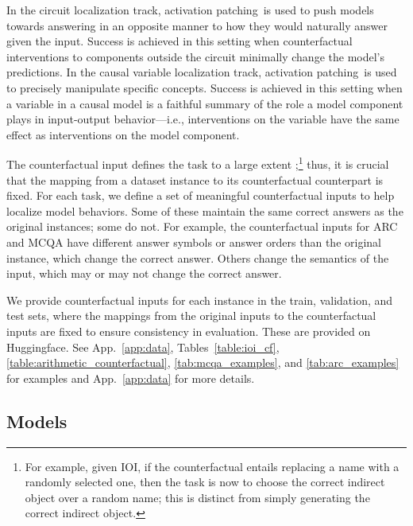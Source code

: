 \documentclass{article}
\theoremstyle{plain}
\theoremstyle{definition}
\theoremstyle{remark}
\newcommand{\variabletrack}{causal variable localization track}
\newcommand{\circuittrack}{circuit localization track}
\newcommand{\patching}{activation patching}
\newcommand{\arxiv}[1]{#1}
\begin{document}
In the \circuittrack, \patching\ is used to push models towards answering in an opposite manner to how they would naturally answer given the input. Success is achieved in this setting when counterfactual interventions to components outside the circuit minimally change the model's predictions. In the \variabletrack, \patching\ is used to precisely manipulate specific concepts. Success is achieved in this setting when a variable in a causal model is a faithful summary of the role a model component plays in input-output behavior---i.e., interventions on the variable have the same effect as interventions on the model component.

The counterfactual \arxiv{input} defines the task to a large extent \citep{miller2024transformer};\footnote{For example, given IOI, if the counterfactual entails replacing a name with a randomly selected one, then the task is now to choose the correct indirect object over a random name; this is distinct from simply generating the correct indirect object.}
thus, it is crucial that the mapping from a dataset instance to its counterfactual counterpart is fixed. For each task, we define a set of meaningful counterfactual inputs to help localize model behaviors.  Some of these maintain the same correct answers as the original instances; some do not. 
For example, the counterfactual inputs for ARC and MCQA have different answer symbols or answer orders than the original instance, which change the correct answer. Others change the semantics of the input, which may or may not change the correct answer. 

We provide counterfactual inputs for each instance in the train, validation, and test sets, where the mappings from the original inputs to the counterfactual inputs are fixed to ensure consistency in evaluation. These are provided on Huggingface.  See App.~\ref{app:data}, Tables~\ref{table:ioi_cf}, \ref{table:arithmetic_counterfactual}, \ref{tab:mcqa_examples}, and \ref{tab:arc_examples} for examples and App.~\ref{app:data} for more details. 


\subsection{Models}\label{ssec:general_metrics}
\label{sec:benchmarking}
\end{document}
